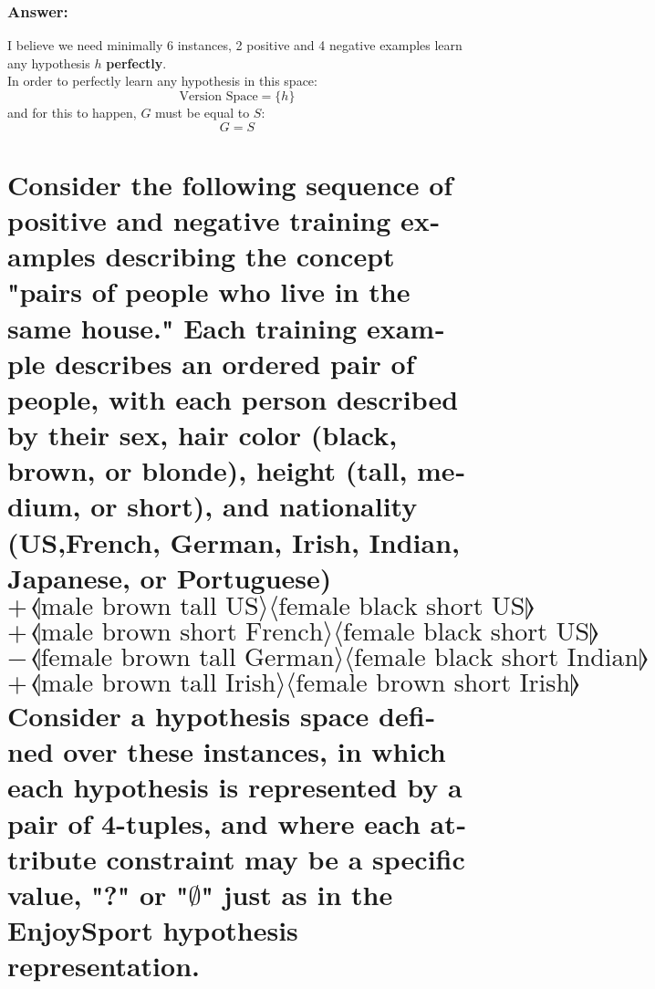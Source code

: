 \documentclass{article}
\newcommand{\ap}[3]{\draw (#1,#2) node[scale=2] {#3};}
\newcommand{\mkrect}[5][black]{%
	\draw[#1,very thick] (#2,#3) rectangle (#4,#5);
}
\newcommand{\mksample}[3]{#3 \hspace{2pt} \llangle \text{#1} \rangle \langle \text{#2} \rrangle}
\begin{document}
\begin{latin}
				\subsubsection*{Answer:}
				I believe we need minimally 6 instances, 2 positive and 4 negative examples learn any hypothesis $h$ \textbf{perfectly}.\\
				In order to perfectly learn any hypothesis in this space:
				$$
				\text{Version Space} = \{h\}
				$$
				and for this to happen, $G$ must be equal to $S$:
				$$
				G = S 
				$$
					\begin{figure}[h!]
						\centering
					\end{figure}	
					
		\section{Consider the following sequence of positive and negative training examples
			describing the concept "pairs of people who live in the same house." Each training
			example describes an ordered pair of people, with each person described by their
			sex, hair color (black, brown, or blonde), height (tall, medium, or short), and
			nationality (US,French, German, Irish, Indian, Japanese, or Portuguese)
			$$ \mksample{male brown tall US}{female black short US}{+} $$
			$$ \mksample{male brown short French}{female black short US}{+} $$
			$$ \mksample{female brown tall German}{female black short Indian}{-} $$
			$$ \mksample{male brown tall Irish}{female brown short Irish}{+} $$
			Consider a hypothesis space defined over these instances, in which each hypothesis
			is represented by a pair of 4-tuples, and where each attribute constraint may be a
			specific value, "?" or "$\emptyset$" just as in the EnjoySport hypothesis representation.
			}

\end{latin}
\end{document}
